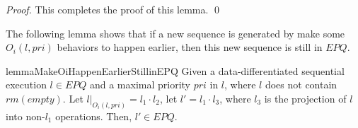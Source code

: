 \begin {proof}
This completes the proof of this lemma. \qed
\end {proof}



The following lemma shows that if a new sequence is generated by make some $O_i(l,\textit{pri})$ behaviors to happen earlier, then this new sequence is still in $\textit{EPQ}$.

\begin{restatable}{lemma}{MakeOiHappenEarlierStillinEPQ}
\label{lemma:make Oi happen earlier still in EPQ}
Given a data-differentiated sequential execution $l \in \textit{EPQ}$ and a maximal priority $\textit{pri}$ in $l$, where $l$ does not contain $\textit{rm}(\textit{empty})$. Let $l \vert_{ O_i(l,\textit{pri}) } = l_1 \cdot l_2$, let $l' = l_1 \cdot l_3$, where $l_3$ is the projection of $l$ into non-$l_1$ operations. Then, $l' \in \textit{EPQ}$.
\end{restatable}

